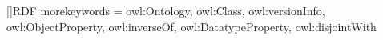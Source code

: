 []{RDF}{%
	morekeywords = {owl:Ontology, owl:Class, owl:versionInfo,
			owl:ObjectProperty, owl:inverseOf,
			owl:DatatypeProperty, owl:disjointWith
	}
}



